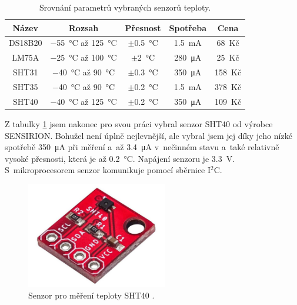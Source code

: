 \begin{table}[b]
    \caption{Srovnání parametrů vybraných senzorů teploty.}
    \centering
    \begin{tabular}{c|cccc}
    \textbf{Název} & \textbf{Rozsah}                         & \textbf{Přesnost}       & \textbf{Spotřeba}       & \textbf{Cena} \\ \hline
    DS18B20 \cite{dat_DS18B20}        & \SI{-55}{\celsius} až \SI{125}{\celsius} & $\pm$\SI{0,5}{\celsius} & \SI{1,5}{\milli\ampere} & 68~Kč         \\
    LM75A \cite{dat_LM75A}          & \SI{-25}{\celsius} až \SI{100}{\celsius} & $\pm$\SI{2}{\celsius}   & \SI{280}{\micro\ampere} & 25~Kč         \\
    SHT31 \cite{dat_SHT31}          & \SI{-40}{\celsius} až \SI{90}{\celsius}  & $\pm$\SI{0,3}{\celsius} & \SI{350}{\micro\ampere} & 158~Kč        \\
    SHT35 \cite{dat_SHT35}          & \SI{-40}{\celsius} až \SI{90}{\celsius}  & $\pm$\SI{0,2}{\celsius} & \SI{1,5}{\milli\ampere} & 378~Kč        \\
    SHT40 \cite{dat_SHT40}          & \SI{-40}{\celsius} až \SI{125}{\celsius} & $\pm$\SI{0,2}{\celsius} & \SI{350}{\micro\ampere} & 109~Kč             
    \end{tabular}
    \label{tab_TemperatureSensors}
\end{table}

Z tabulky \ref{tab_TemperatureSensors} jsem nakonec pro svou práci vybral senzor SHT40 od výrobce SENSIRION. Bohužel není úplně nejlevnější, ale vybral jsem jej díky jeho nízké spotřebě \SI{350}{\micro\ampere} při měření a~až \SI{3,4}{\micro\ampere} v~nečinném stavu a~také relativně vysoké přesnosti, která je až \SI{0,2}{\celsius}. Napájení senzoru je \SI{3,3}{\volt}. S~mikroprocesorem senzor komunikuje pomocí sběrnice I$^2$C. 

\begin{figure}
    \centering
    \includegraphics[width=0.55\textwidth]{obrazky/sht40.jpg}
    \caption[Senzor pro měření teploty SHT40.]{Senzor pro měření teploty SHT40 \cite{SHT40}.}
    \label{fig_SHT40}
\end{figure}


